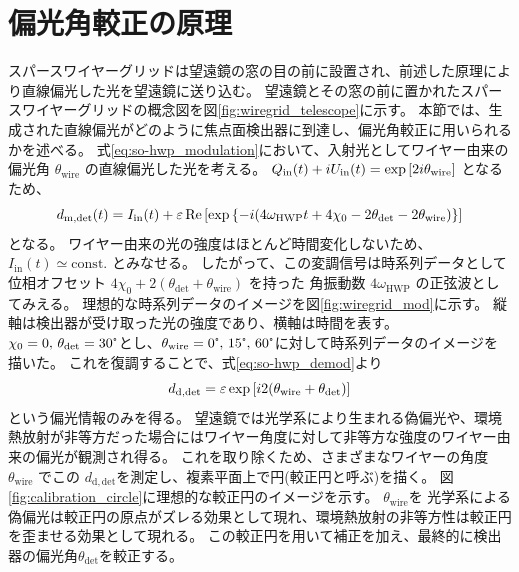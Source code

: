 \documentclass[../../main.tex]{subfiles}
\begin{document}
\section{偏光角較正の原理}
スパースワイヤーグリッドは望遠鏡の窓の目の前に設置され、前述した原理により直線偏光した光を望遠鏡に送り込む。
望遠鏡とその窓の前に置かれたスパースワイヤーグリッドの概念図を図\ref{fig:wiregrid_telescope}に示す。
本節では、生成された直線偏光がどのように焦点面検出器に到達し、偏光角較正に用いられるかを述べる。
式\eqref{eq:so-hwp_modulation}において、入射光としてワイヤー由来の偏光角 $\theta_{\mathrm{wire}}$ の直線偏光した光を考える。
$Q_{\mathrm{in}}(t) + iU_{\mathrm{in}}(t) = \exp\qty[2i\theta_{\mathrm{wire}}]$ となるため、
\begin{equation}
    d_{\mathrm{m}, \mathrm{det}}(t) = I_{\mathrm{in}}(t) + \varepsilon\Re\qty[\exp\qty{-i \qty(4\omega_{\mathrm{HWP}}t + 4\chi_0 - 2\theta_{\mathrm{det}} - 2\theta_{\mathrm{wire}})}]
\end{equation}
となる。
ワイヤー由来の光の強度はほとんど時間変化しないため、$I_{\mathrm{in}}(t) \simeq \mathrm{const.}$ とみなせる。
したがって、この変調信号は時系列データとして位相オフセット $4\chi_0 + 2(\theta_{\mathrm{det}} + \theta_{\mathrm{wire}})$ を持った
角振動数 $4\omega_{\mathrm{HWP}}$ の正弦波としてみえる。
理想的な時系列データのイメージを図\ref{fig:wiregrid_mod}に示す。
縦軸は検出器が受け取った光の強度であり、横軸は時間を表す。
$\chi_0=0,\,\theta_{\mathrm{det}}=30\tcdegree$とし、$\theta_\mathrm{wire}=0\tcdegree,\,15\tcdegree,\,60\tcdegree$に対して時系列データのイメージを描いた。
これを復調することで、式\eqref{eq:so-hwp_demod}より
\begin{equation}
    d_{\mathrm{d, det}} = \varepsilon\exp\qty[i2\qty(\theta_{\mathrm{wire}} + \theta_{\mathrm{det}})]
    \label{eq:wiregrid_mod}
\end{equation}
という偏光情報のみを得る。
望遠鏡では光学系により生まれる偽偏光や、環境熱放射が非等方だった場合にはワイヤー角度に対して非等方な強度のワイヤー由来の偏光が観測され得る。
これを取り除くため、さまざまなワイヤーの角度$\theta_{\mathrm{wire}}$ でこの $d_{\mathrm{d, det}}$を測定し、複素平面上で円(較正円と呼ぶ)を描く。
図\ref{fig:calibration_circle}に理想的な較正円のイメージを示す。
$\theta_{\mathrm{wire}}$を
光学系による偽偏光は較正円の原点がズレる効果として現れ、環境熱放射の非等方性は較正円を歪ませる効果として現れる。
この較正円を用いて補正を加え、最終的に検出器の偏光角$\theta_{\mathrm{det}}$を較正する。
\end{document}
